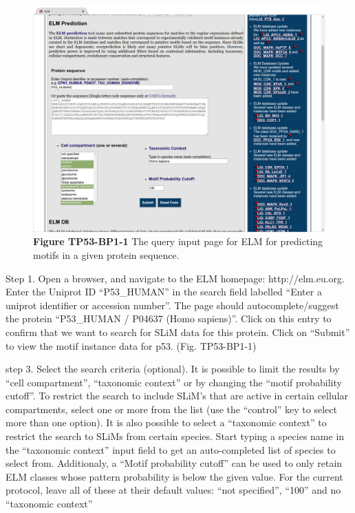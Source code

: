 \begin{figure}[h!]
\centering
\includegraphics[width=\textwidth]{Figures/TP53_1/elm_search.png} 
\caption{
\textbf{Figure TP53-BP1-1}
The query input page for ELM for predicting motifs in a
given protein sequence.
}
\end{figure}

Step 1. Open a browser, and navigate to the ELM homepage:
http://elm.eu.org. Enter the Uniprot ID ``P53\_HUMAN'' in the search
field labelled ``Enter a uniprot identifier or accession number''. The
page should autocomplete/suggest the protein ``P53\_HUMAN / P04637 (Homo
sapiens)''. Click on this entry to confirm that we want to search for
SLiM data for this protein. Click on ``Submit'' to view the motif
instance data for p53. (Fig. TP53-BP1-1)


step 3. Select the search criteria (optional). It is possible to limit
the results by ``cell compartment'', ``taxonomic context'' or by
changing the ``motif probability cutoff''. To restrict the search to
include SLiM's that are active in certain cellular compartments, select
one or more from the list (use the ``control'' key to select more than
one option). It is also possible to select a ``taxonomic context'' to
restrict the search to SLiMs from certain species. Start typing a
species name in the ``taxonomic context'' input field to get an
auto-completed list of species to select from. Additionaly, a ``Motif
probability cutoff'' can be used to only retain ELM classes whose
pattern probability is below the given value. For the current protocol,
leave all of these at their default values: ``not specified'', ``100''
and no ``taxonomic context''

